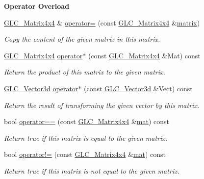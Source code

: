 \begin{Indent}{\bf Operator Overload}\par
\begin{DoxyCompactItemize}
\item 
\hyperlink{class_g_l_c___matrix4x4}{G\-L\-C\-\_\-\-Matrix4x4} \& \hyperlink{class_g_l_c___matrix4x4_aa1a22247a90eca6f47dfa20cd5364a8b}{operator=} (const \hyperlink{class_g_l_c___matrix4x4}{G\-L\-C\-\_\-\-Matrix4x4} \&\hyperlink{glext_8h_a7b24a3f2f56eb1244ae69dacb4fecb6f}{matrix})
\begin{DoxyCompactList}\small\item\em Copy the content of the given matrix in this matrix. \end{DoxyCompactList}\item 
\hyperlink{class_g_l_c___matrix4x4}{G\-L\-C\-\_\-\-Matrix4x4} \hyperlink{class_g_l_c___matrix4x4_a28f0632f6d7c0e60a3215e49d4113a10}{operator$\ast$} (const \hyperlink{class_g_l_c___matrix4x4}{G\-L\-C\-\_\-\-Matrix4x4} \&Mat) const 
\begin{DoxyCompactList}\small\item\em Return the product of this matrix to the given matrix. \end{DoxyCompactList}\item 
\hyperlink{class_g_l_c___vector3d}{G\-L\-C\-\_\-\-Vector3d} \hyperlink{class_g_l_c___matrix4x4_a5e35d853275351b9f9092e54cd3f3065}{operator$\ast$} (const \hyperlink{class_g_l_c___vector3d}{G\-L\-C\-\_\-\-Vector3d} \&Vect) const 
\begin{DoxyCompactList}\small\item\em Return the result of transforming the given vector by this matrix. \end{DoxyCompactList}\item 
bool \hyperlink{class_g_l_c___matrix4x4_a36a788035a90ee5dd6b834cbfd1afa1a}{operator==} (const \hyperlink{class_g_l_c___matrix4x4}{G\-L\-C\-\_\-\-Matrix4x4} \&\hyperlink{uavobjecttemplate_8m_a16a51e808b16c46bbfd36da2e37cd123}{mat}) const 
\begin{DoxyCompactList}\small\item\em Return true if this matrix is equal to the given matrix. \end{DoxyCompactList}\item 
bool \hyperlink{class_g_l_c___matrix4x4_ae5f21edae52d1a159962741b6ea76587}{operator!=} (const \hyperlink{class_g_l_c___matrix4x4}{G\-L\-C\-\_\-\-Matrix4x4} \&\hyperlink{uavobjecttemplate_8m_a16a51e808b16c46bbfd36da2e37cd123}{mat}) const 
\begin{DoxyCompactList}\small\item\em Return true if this matrix is not equal to the given matrix. \end{DoxyCompactList}\end{DoxyCompactItemize}
\end{Indent}
